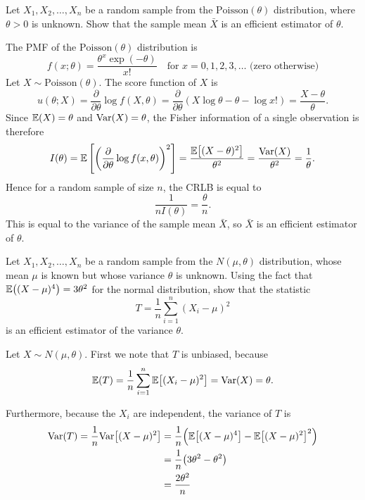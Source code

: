 \begin{exercise}
\begin{questions}
\question
Let $X_1,X_2,\ldots,X_n$ be a random sample from the $\text{Poisson}(\theta)$ distribution, where $\theta>0$ is unknown. Show that the sample mean $\bar{X}$ is an efficient estimator of $\theta$.

\begin{answer}
The PMF of the $\text{Poisson}(\theta)$ distribution is
\[
f(x;\theta) = \frac{\theta^x\exp(-\theta)}{x!} \quad \text{for $x=0,1,2,3,\ldots$ (zero otherwise)}
\]
Let $X\sim\text{Poisson}(\theta)$. The score function of $X$ is
\[
u(\theta;X)
	= \frac{\partial}{\partial\theta}\log f(X,\theta)
	= \frac{\partial}{\partial\theta}(X\log\theta - \theta - \log x!)
	= \frac{X-\theta}{\theta}.
\]
Since $\mathbb{E}(X)=\theta$ and $\text{Var}(X)=\theta$, the Fisher information of a single observation is therefore
\[
I(\theta) 
	= \mathbb{E}\left[\left(\frac{\partial}{\partial\theta}\log f(x,\theta)\right)^2\right]
	= \frac{\mathbb{E}\big[(X-\theta)^2\big]}{\theta^2} = \frac{\text{Var}(X)}{\theta^2} = \frac{1}{\theta}.
\]
Hence for a random sample of size $n$, the CRLB is equal to 
\[
\frac{1}{nI(\theta)} = \frac{\theta}{n}.
\]
This is equal to the variance of the sample mean $\bar{X}$, so $\bar{X}$ is an efficient estimator of $\theta$.

\end{answer}


\question
Let $X_1,X_2,\ldots,X_n$ be a random sample from the $N(\mu,\theta)$ distribution, whose mean $\mu$ is known but whose variance $\theta$ is unknown. Using the fact that $\mathbb{E}\big((X-\mu)^4\big)=3\theta^2$ for the normal distribution, show that the statistic
\[
T = \frac{1}{n}\sum_{i=1}^{n} (X_i-\mu)^2 
\]
is an efficient estimator of the variance $\theta$.

\begin{answer}
Let $X\sim N(\mu,\theta)$. First we note that $T$ is unbiased, because
\[
\mathbb{E}(T) = \frac{1}{n}\sum_{i=1}^{n} \mathbb{E}\big[(X_i-\mu)^2\big] = \text{Var}(X) = \theta.
\]

Furthermore, because the $X_i$ are independent, the variance of $T$ is
\begin{align*}
\text{Var}(T) 
	= \frac{1}{n}\text{Var}\big[(X-\mu)^2\big]
	& = \frac{1}{n}\Big(\mathbb{E}\big[(X-\mu)^4\big] - \mathbb{E}\big[(X-\mu)^2\big]^2\Big) \\
	& = \frac{1}{n}\big(3\theta^2 - \theta^2\big) \\
	& = \frac{2\theta^2}{n}
\end{align*}


\end{answer}
\end{questions}
\end{exercise}
